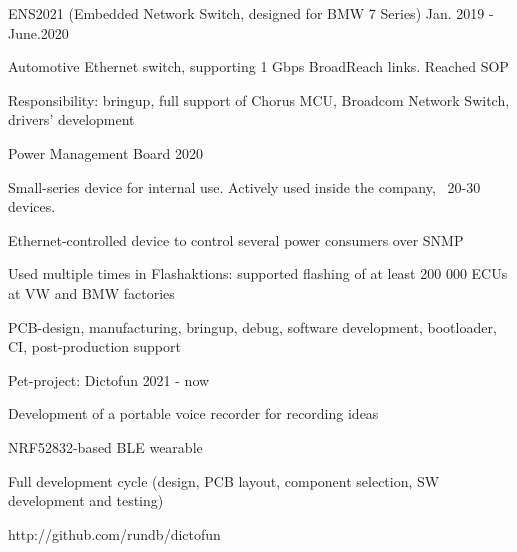 \begin{cventries}
\cventry
{} %
{ENS2021 (Embedded Network Switch, designed for BMW 7 Series)} %
{} %
{Jan. 2019 - June.2020} %
{ %
\begin{cvitems}
\item {Automotive Ethernet switch, supporting 1 Gbps BroadReach links. Reached SOP}
\item {Responsibility: bringup, full support of Chorus MCU, Broadcom Network Switch, drivers' development}
\end{cvitems}
}
\newline
\newline


\cventry
{} %
{Power Management Board} %
{} %
{2020} %
{ %
\begin{cvitems}
\item {Small-series device for internal use. Actively used inside the company, ~20-30 devices. }
\item {Ethernet-controlled device to control several power consumers over SNMP}
\item {Used multiple times in Flashaktions: supported flashing of at least 200 000 ECUs at VW and BMW factories}
\item {PCB-design, manufacturing, bringup, debug, software development, bootloader, CI, post-production support}
\end{cvitems}
}
\newline
\newline


\cventry
{} %
{Pet-project: Dictofun} %
{} %
{2021 - now} %
{ %
\begin{cvitems}
\item {Development of a portable voice recorder for recording ideas}
\item {NRF52832-based BLE wearable}
\item {Full development cycle (design, PCB layout, component selection, SW development and testing)}
\item {http://github.com/rundb/dictofun}
\end{cvitems}
}
\newline
\newline

\end{cventries}